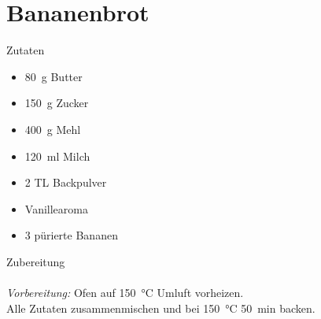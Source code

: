 \section*{Bananenbrot}
\ihead{}\ohead{}
\cfoot{}
{\Large Zutaten}
\begin{multicols}{2}
\begin{itemize}
    \item \SI{80}{g} Butter
    \item \SI{150}{g} Zucker
    \item \SI{400}{g} Mehl
    \item \SI{120}{ml} Milch
    \item \num{2} TL Backpulver
    \item Vanillearoma
    \item \num{3} pürierte Bananen
\end{itemize}
\end{multicols}
\noindent
{\Large Zubereitung}\\
\\
\textit{Vorbereitung:} Ofen auf \SI{150}{\celsius} Umluft vorheizen.\\
Alle Zutaten zusammenmischen und bei \SI{150}{\celsius} \SI{50}{min} backen.